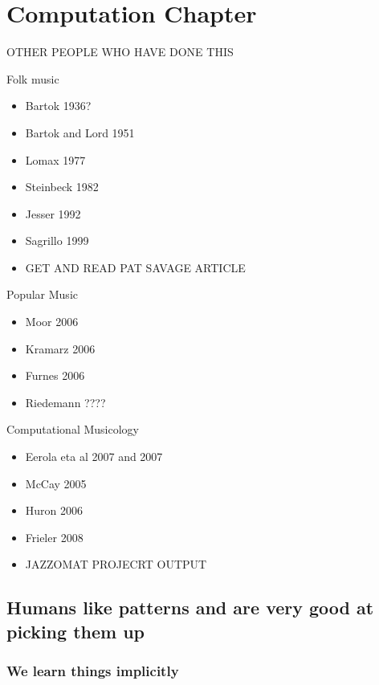 \documentclass[]{book}
\providecommand{\tightlist}{%
  \setlength{\itemsep}{0pt}\setlength{\parskip}{0pt}}
\theoremstyle{definition}
\theoremstyle{definition}
\theoremstyle{definition}
\theoremstyle{remark}
\begin{document}
\hypertarget{computation-chapter}{%
\chapter{Computation Chapter}\label{computation-chapter}}

OTHER PEOPLE WHO HAVE DONE THIS

Folk music

\begin{itemize}
\item
  Bartok 1936?
\item
  Bartok and Lord 1951
\item
  Lomax 1977
\item
  Steinbeck 1982
\item
  Jesser 1992
\item
  Sagrillo 1999
\item
  GET AND READ PAT SAVAGE ARTICLE
\end{itemize}

Popular Music

\begin{itemize}
\tightlist
\item
  Moor 2006
\item
  Kramarz 2006
\item
  Furnes 2006
\item
  Riedemann ????
\end{itemize}

Computational Musicology

\begin{itemize}
\tightlist
\item
  Eerola eta al 2007 and 2007
\item
  McCay 2005
\item
  Huron 2006
\item
  Frieler 2008
\item
  JAZZOMAT PROJECRT OUTPUT
\end{itemize}

\hypertarget{humans-like-patterns-and-are-very-good-at-picking-them-up}{%
\section{Humans like patterns and are very good at picking them
up}\label{humans-like-patterns-and-are-very-good-at-picking-them-up}}

\hypertarget{we-learn-things-implicitly}{%
\subsection{We learn things
implicitly}\label{we-learn-things-implicitly}}
\end{document}
